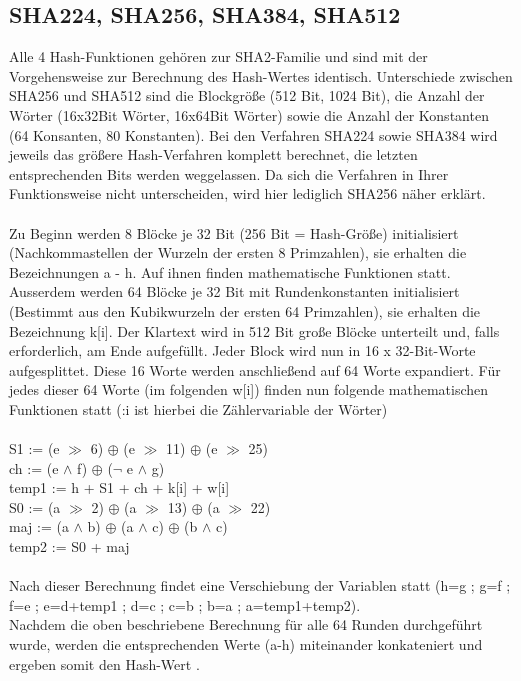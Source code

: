 \documentclass[10pt, a4paper,headsepline]{scrreprt}
\begin{document}
\subsection{SHA224, SHA256, SHA384, SHA512}
Alle 4 Hash-Funktionen gehören zur SHA2-Familie und sind mit der Vorgehensweise zur Berechnung des Hash-Wertes identisch. Unterschiede zwischen SHA256 und SHA512 sind die Blockgröße (512 Bit, 1024 Bit), die Anzahl der Wörter (16x32Bit Wörter, 16x64Bit Wörter) sowie die Anzahl der Konstanten (64 Konsanten, 80 Konstanten). Bei den Verfahren SHA224 sowie SHA384 wird jeweils das größere Hash-Verfahren komplett berechnet, die letzten entsprechenden Bits werden weggelassen. Da sich die Verfahren in Ihrer Funktionsweise nicht unterscheiden, wird hier lediglich SHA256 näher erklärt.  \\ \\
Zu Beginn werden 8 Blöcke je 32 Bit (256 Bit = Hash-Größe) initialisiert (Nachkommastellen der Wurzeln der ersten 8 Primzahlen), sie erhalten die Bezeichnungen a - h. Auf ihnen finden mathematische Funktionen statt. Ausserdem werden 64 Blöcke je 32 Bit mit Rundenkonstanten initialisiert (Bestimmt aus den Kubikwurzeln der ersten 64 Primzahlen), sie erhalten die Bezeichnung k[i].
Der Klartext wird in 512 Bit große Blöcke unterteilt und, falls erforderlich, am Ende aufgefüllt. Jeder Block wird nun in 16 x 32-Bit-Worte aufgesplittet. Diese 16 Worte werden anschließend auf 64 Worte expandiert. Für jedes dieser 64 Worte (im folgenden w[i]) finden nun folgende mathematischen Funktionen statt (:i ist hierbei die Zählervariable der Wörter) \\ \\
S1 := (e $\gg$ 6) $\oplus$ (e $\gg$ 11) $\oplus$ (e $\gg$ 25) \\
ch := (e $\land$ f) $\oplus$ ($\lnot$ e $\land$ g) \\
temp1 := h + S1 + ch + k[i] + w[i]\\
S0 := (a $\gg$ 2) $\oplus$ (a $\gg$ 13) $\oplus$ (a $\gg$ 22) \\
maj := (a $\land$ b) $\oplus$ (a $\land$ c) $\oplus$ (b $\land$ c) \\
temp2 := S0 + maj \\ \\
Nach dieser Berechnung findet eine Verschiebung der Variablen statt (h=g ; g=f ; f=e ; e=d+temp1 ; d=c ; c=b ; b=a ; a=temp1+temp2). \\
Nachdem die oben beschriebene Berechnung für alle 64 Runden durchgeführt wurde, werden die entsprechenden Werte (a-h) miteinander konkateniert und ergeben somit den Hash-Wert \cite{website:nist-sha} \citep[S. 89f]{book:practical-crypto}.
\end{document}
